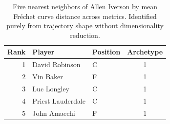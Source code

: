 \begin{table}[htbp]
  \centering\small
  \begin{tabular}{rllc}
    \toprule
    Rank & Player & Position & Archetype \\
    \midrule
    1 & David Robinson & C & 1 \\
    2 & Vin Baker & F & 1 \\
    3 & Luc Longley & C & 1 \\
    4 & Priest Lauderdale & C & 1 \\
    5 & John Amaechi & F & 1 \\
    \bottomrule
  \end{tabular}
  \caption{Five nearest neighbors of Allen Iverson by mean Fr\'{e}chet curve distance across metrics. Identified purely from trajectory shape without dimensionality reduction.}
  \label{tab:Allen_Iverson_frechet_curve_neighbors}
\end{table}

